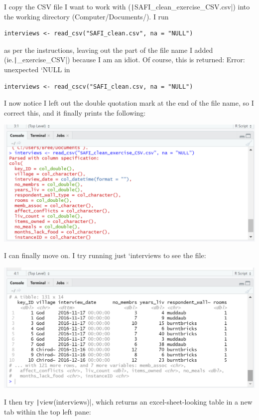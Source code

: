\documentclass{article}
\begin{document}
I copy the CSV file I want to work with (\texttt|SAFI_clean_exercise_CSV.csv|) into the working directory (Computer/Documents/). I run

\begin{verbatim}
interviews <- read_csv("SAFI_clean.csv", na = "NULL") 
\end{verbatim}

 as per the instructions, leaving out the part of the file name I added (ie.\texttt|_exercise_CSV|) because I am an idiot. Of course, this is returned: Error: unexpected `NULL in
 
\begin{verbatim}
interviews <- read_cscv("SAFI_clean.csv, na = "NULL")
\end{verbatim}
 
 I now notice I left out the double quotation mark at the end of the file name, so I correct this, and it finally prints the following:

\includegraphics[width=1.0\textwidth]{rstudio_15.PNG}

I can finally move on. I try running just `interviews to see the file:

\includegraphics[width=1.0\textwidth]{rstudio_16.PNG}

I then try \texttt|view(interviews)|, which returns an excel-sheet-looking table in a new tab within the top left pane:
\end{document}
